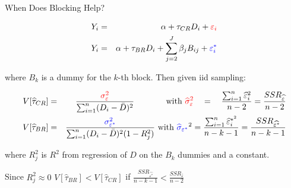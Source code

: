 \documentclass{beamer}
\numberwithin{equation}{section}
\begin{document}
\begin{frame}{When Does Blocking Help?}
\small
\begin{small}
\begin{eqnarray}
  Y_i &=& \alpha + \tau_{CR} D_i + \textcolor{red}{\varepsilon_i}  \\
  Y_i &=& \alpha + \tau_{BR} D_i + \sum_{j=2}^J \beta_j B_{ij}+ \textcolor{blue}{\varepsilon^{\ast}_i}
\end{eqnarray}
\end{small}

where $B_k$ is a dummy for the $k$-th block. Then given iid sampling:

\begin{small}
\begin{eqnarray}
V[\widehat{\tau}_{CR}]  &=& \frac{\textcolor{red}{\sigma_{\varepsilon}^2}}{\sum_{i=1}^n (D_i - \bar{D})^2}\quad \,\,\, \quad \quad \mbox{ with } \textcolor{red}{\widehat{\sigma}_{\varepsilon}^2} \quad =  \quad\frac{\sum_{i=1}^n \widehat{\varepsilon}_i^2}{n-2}=\frac{SSR_{\widehat{\varepsilon}}}{n-2}\nonumber \\
V[\widehat{\tau}_{BR}]  &=&  \frac{\textcolor{blue}{\sigma_{\varepsilon^{\ast}}^2}}{\sum_{i=1}^n (D_{i} - \bar{D})^2 (1-R_j^2)}\mbox{ with } \textcolor{blue}{\widehat{\sigma}_{\varepsilon^{\ast}}}^2 = \frac{\sum_{i=1}^n \widehat{ \varepsilon }^{\ast^2}_{i}}{n-k-1}=\frac{SSR_{\widehat{\varepsilon^{\ast}}}}{n-k-1}\nonumber
\end{eqnarray}
\end{small}

where $R_j^2$ is $R^2$ from regression of $D$ on the $B_k$ dummies and
a constant.

Since $R_j^2\approx0$ $V[\widehat{\tau}_{BR}]<V[\widehat{\tau}_{CR}]$ if
$\frac{SSR_{\widehat{\varepsilon^{\ast}}}}{n-k-1}<\frac{SSR_{\widehat{\varepsilon}}}{n-2}$

\end{frame}
\end{document}

